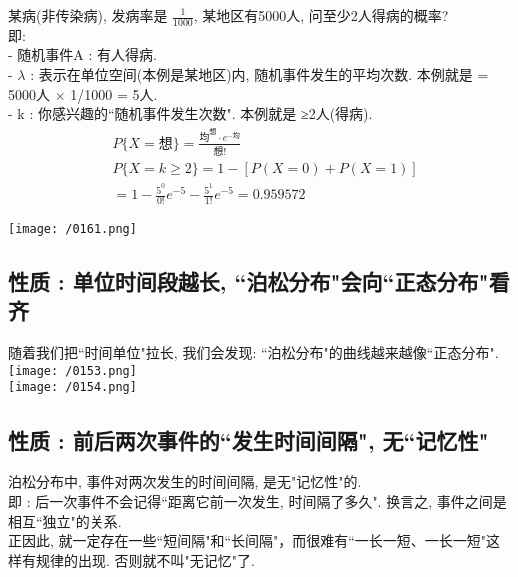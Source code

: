 \documentclass[UTF8]{ctexart}
\begin{document}
	
	
	
	\begin{myEnvSample}
		某病(非传染病), 发病率是 $\frac{1} {1000}$, 某地区有5000人, 问至少2人得病的概率? \\
		即: \\
		- 随机事件A : 有人得病. \\
		- $\lambda$ : 表示在单位空间(本例是某地区)内, 随机事件发生的平均次数. 本例就是 = 5000人 × 1/1000 = 5人. \\
		- k : 你感兴趣的``随机事件发生次数". 本例就是 ≥2人(得病).  		
		\begin{align*}  %
	&P\{X=\text{想\}}=\frac{\text{均}^{\text{想}}\cdot e^{-\text{均}}}{\text{想!}}\\
&P\{X=k\ge 2\}=1-\left[ P\left( X=0 \right) +P\left( X=1 \right) \right]\\
&=1-\frac{5^0}{0!}e^{-5}-\frac{5^1}{1!}e^{-5}=0.959572
		\end{align*}
	
	\texttt{[image: /0161.png]}
		
	\end{myEnvSample}
	
	
	
	
	
	\subsection{性质 : 单位时间段越长, ``泊松分布"会向``正态分布"看齐 }
	
	随着我们把``时间单位"拉长, 我们会发现: ``泊松分布"的曲线越来越像``正态分布". \\
	
		\texttt{[image: /0153.png]} \\	
		\texttt{[image: /0154.png]} \\	
	
	
	
	\subsection{性质 : 前后两次事件的``发生时间间隔", 无``记忆性"}
	
	泊松分布中, 事件对两次发生的时间间隔, 是无"记忆性"的. \\
	即 : 后一次事件不会记得``距离它前一次发生, 时间隔了多久". 换言之, 事件之间是相互``独立"的关系. \\
	正因此, 就一定存在一些``短间隔"和``长间隔"，而很难有``一长一短、一长一短"这样有规律的出现. 否则就不叫"无记忆"了. 
	
	
	
	
	
	
\end{document}
